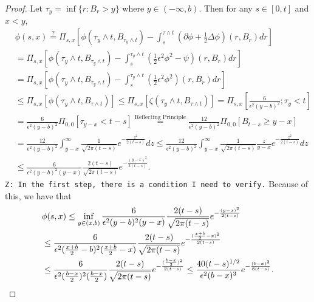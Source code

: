 \documentclass[12pt,a4paper]{amsart}
\numberwithin{equation}{section}
\theoremstyle{plain}
\theoremstyle{remark}
\begin{document}
\begin{proof}
	Let $\tau_y = \inf \{r: B_r > y\}$ where $y \in (-\infty, b)$.
	Then for any $s \in [0,t]$ and $x < y$, 
\begin{align}
	&\phi(s,x) \overset{?}= \Pi_{s,x}\left[ \phi (\tau_y \wedge t, B_{\tau_y \wedge t}) - \int_s^{\tau \wedge t} (\partial \phi + \frac{1}{2} \Delta \phi)(r,B_r) dr\right]
	\\& = \Pi_{s,x}\left[ \phi (\tau_y \wedge t, B_{\tau_y \wedge t}) - \int_s^{\tau_y \wedge t} (\frac{1}{2}\epsilon^2 \phi^2 - \psi )(r,B_r) dr\right]
		\\& = \Pi_{s,x}\left[ \phi (\tau_y \wedge t, B_{\tau_y \wedge t}) - \int_s^{\tau_y \wedge t} (\frac{1}{2}\epsilon^2 \phi^2 )(r,B_r) dr\right]
		\\& \leq \Pi_{s,x}[ \phi (\tau_y \wedge t, B_{\tau \wedge t})]
		\leq \Pi_{s,x}[ \zeta (\tau_y \wedge t, B_{\tau \wedge t})]
		= \Pi_{s,x}\left[\frac{6}{\epsilon^2(y - b)^2};\tau_y<t\right]
		\\& = \frac{6}{\epsilon^2(y - b)^2} \Pi_{0,0}[\tau_{y-x} < t-s]
		\overset{\text{Reflecting Principle}}=\frac{12}{\epsilon^2(y - b)^2} \Pi_{0,0}[B_{t-s} \geq y-x]
		\\& = \frac{12}{\epsilon^2(y - b)^2} \int_{y-x}^\infty \frac{1}{\sqrt{2\pi(t-s)}} e^{- \frac{z^2}{2(t-s)}} dz
		\leq \frac{12}{\epsilon^2(y - b)^2} \int_{y-x}^\infty \frac{1}{\sqrt{2\pi(t-s)}} \frac{z}{y-x}e^{- \frac{z^2}{2(t-s)}} dz
		\\& \leq \frac{6}{\epsilon^2(y - b)^2(y-x)} \frac{2(t-s)}{\sqrt{2\pi(t-s)}} e^{ - \frac{(y-x)^2}{2(t-s)}}.
\end{align}
	{\tt Z: In the first step, there is a condition I need to verify.}
	Because of this, we have that
\begin{align}
	&\phi(s,x) \leq \inf_{y\in (x,b)}\frac{6}{\epsilon^2(y - b)^2(y-x)} \frac{2(t-s)}{\sqrt{2\pi(t-s)}} e^{ - \frac{(y-x)^2}{2(t-s)}}
	\\&\leq \frac{6}{\epsilon^2(\frac{x+b}{2}- b)^2(\frac{x+b}{2}-x)} \frac{2(t-s)}{\sqrt{2\pi(t-s)}} e^{ - \frac{(\frac{x+b}{2}-x)^2}{2(t-s)}}
	\\& \leq \frac{6}{\epsilon^2(\frac{b-x}{2})^2(\frac{b-x}{2})} \frac{2(t-s)}{\sqrt{2\pi(t-s)}} e^{ - \frac{(\frac{b-x}{2})^2}{2(t-s)}}
	\leq  \frac{40 (t-s)^{1/2}}{\epsilon^2 (b-x)^3} e^{- \frac{(b-x)^2}{8(t-s)}}. 
	\qedhere
\end{align}
\end{proof}
\end{document}
